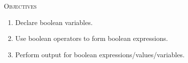 \textsc{Objectives}
 \begin{enumerate}[nosep]      
   \item Declare boolean variables.
   \item Use boolean operators to form boolean expressions.
   \item Perform output for boolean expressions/values/variables.
 \end{enumerate}
